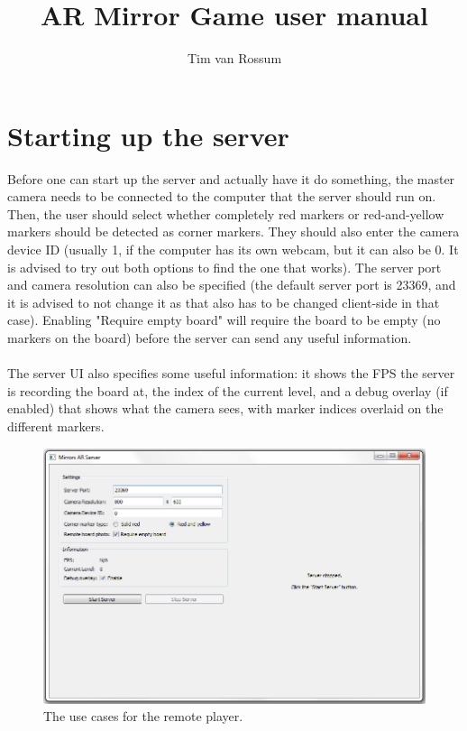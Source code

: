 \documentclass[]{report}
\title{AR Mirror Game user manual}
\author{Tim van Rossum}
\begin{document}
\maketitle
\section*{Starting up the server}
Before one can start up the server and actually have it do something, the master
camera needs to be connected to the computer that the server should run on. 
Then, the user should select whether completely red markers or red-and-yellow
markers should be detected as corner markers. They should also enter the camera
device ID (usually 1, if the computer has its own webcam, but it can also be 0.
It is advised to try out both options to find the one that works). The server
port and camera resolution can also be specified (the default server port is 
23369, and it is advised to not change it as that also has to be changed
client-side in that case). Enabling "Require empty board" will require the board
to be empty (no markers on the board) before the server can send any useful
information.\\
\\
The server UI also specifies some useful information: it shows the FPS the
server is recording the board at, the index of the current level, and a debug
overlay (if enabled) that shows what the camera sees, with marker indices
overlaid on the different markers.
\begin{figure}[!ht]
	\centering
	\includegraphics[scale = 0.5]{MirrorServerUI}
	\caption{The use cases for the remote player.}
\end{figure}
\end{document}
